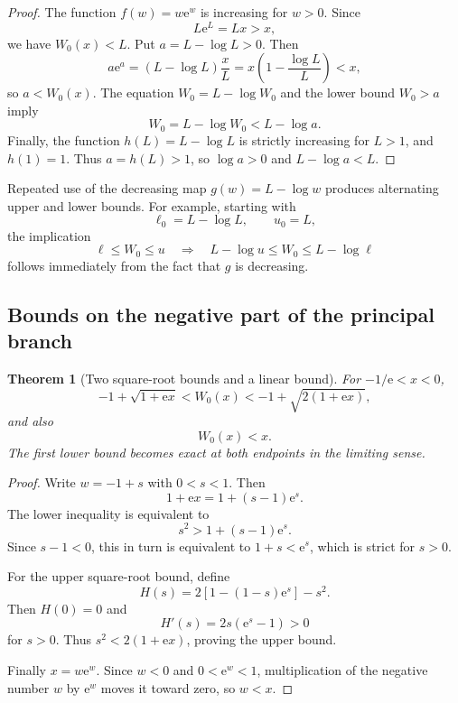 \documentclass[11pt]{article}
\newtheorem{theorem}{Theorem}[section]
\theoremstyle{remark}
\newcommand{\Wz}{W_0}
\newcommand{\ee}{\mathrm e}
\begin{document}
\begin{proof}
The function \(f(w)=w\ee^w\) is increasing for \(w>0\).  Since
\[
       L\ee^L=Lx>x,
\]
we have \(W_0(x)<L\).  Put \(a=L-\log L>0\).  Then
\[
       a\ee^a
       =(L-\log L)\frac{x}{L}
       =x\left(1-\frac{\log L}{L}\right)<x,
\]
so \(a<W_0(x)\).  The equation \(W_0=L-\log W_0\) and the lower bound
\(W_0>a\) imply
\[
       W_0=L-\log W_0<L-\log a.
\]
Finally, the function \(h(L)=L-\log L\) is strictly increasing for
\(L>1\), and \(h(1)=1\).  Thus \(a=h(L)>1\), so \(\log a>0\) and
\(L-\log a<L\).
\end{proof}

Repeated use of the decreasing map \(g(w)=L-\log w\) produces alternating
upper and lower bounds.  For example, starting with
\[
       \ell_0=L-\log L,\qquad u_0=L,
\]
the implication
\[
       \ell\leq W_0\leq u
       \quad\Longrightarrow\quad
       L-\log u\leq W_0\leq L-\log\ell
\]
follows immediately from the fact that \(g\) is decreasing.

\subsection{Bounds on the negative part of the principal branch}

\begin{theorem}[Two square-root bounds and a linear bound]\label{thm:W0negativebounds}
For \(-1/\ee<x<0\),
\begin{equation}\label{eq:W0negativebounds}
 -1+\sqrt{1+\ee x}
 <\Wz(x)
 <-1+\sqrt{2(1+\ee x)},
\end{equation}
and also
\begin{equation}\label{eq:W0xbound}
       \Wz(x)<x.
\end{equation}
The first lower bound becomes exact at both endpoints in the limiting sense.
\end{theorem}

\begin{proof}
Write \(w=-1+s\) with \(0<s<1\).  Then
\[
       1+\ee x=1+(s-1)\ee^s.
\]
The lower inequality is equivalent to
\[
       s^2>1+(s-1)\ee^s.
\]
Since \(s-1<0\), this in turn is equivalent to
\(1+s<\ee^s\), which is strict for \(s>0\).

For the upper square-root bound, define
\[
 H(s)=2[1-(1-s)\ee^s]-s^2.
\]
Then \(H(0)=0\) and
\[
       H'(s)=2s(\ee^s-1)>0
\]
for \(s>0\).  Thus
\(s^2<2(1+\ee x)\), proving the upper bound.

Finally \(x=w\ee^w\).  Since \(w<0\) and \(0<\ee^w<1\), multiplication of
the negative number \(w\) by \(\ee^w\) moves it toward zero, so \(w<x\).
\end{proof}
\end{document}
